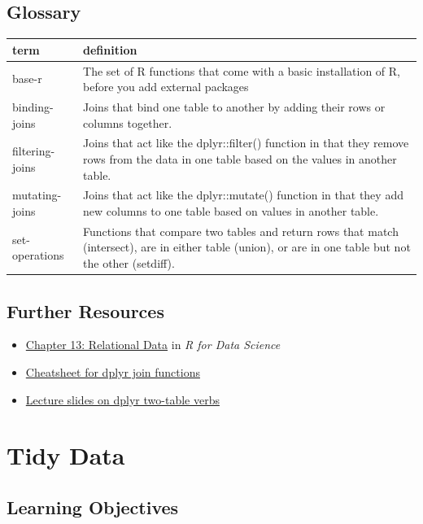 \documentclass[
  oneside]{book}
\providecommand{\tightlist}{%
  \setlength{\itemsep}{0pt}\setlength{\parskip}{0pt}}
\begin{document}
\hypertarget{glossary-joins}{%
\section{Glossary}\label{glossary-joins}}

\begin{tabular}{l|l}
\hline
term & definition\\
\hline
base-r & The set of R functions that come with a basic installation of R, before you add external packages\\
\hline
binding-joins & Joins that bind one table to another by adding their rows or columns together.\\
\hline
filtering-joins & Joins that act like the dplyr::filter() function in that they remove rows from the data in one table based on the values in another table.\\
\hline
mutating-joins & Joins that act like the dplyr::mutate() function in that they add new columns to one table based on values in another table.\\
\hline
set-operations & Functions that compare two tables and return rows that match (intersect), are in either table (union), or are in one table but not the other (setdiff).\\
\hline
\end{tabular}

\hypertarget{resources-joins}{%
\section{Further Resources}\label{resources-joins}}

\begin{itemize}
\tightlist
\item
  \href{http://r4ds.had.co.nz/relational-data.html}{Chapter 13: Relational Data} in \emph{R for Data Science}
\item
  \href{http://stat545.com/bit001_dplyr-cheatsheet.html}{Cheatsheet for dplyr join functions}
\item
  \href{slides/05_joins_slides.pdf}{Lecture slides on dplyr two-table verbs}
\end{itemize}

\hypertarget{tidyr}{%
\chapter{Tidy Data}\label{tidyr}}

\hypertarget{ilo-tidyr}{%
\section{Learning Objectives}\label{ilo-tidyr}}
\end{document}

